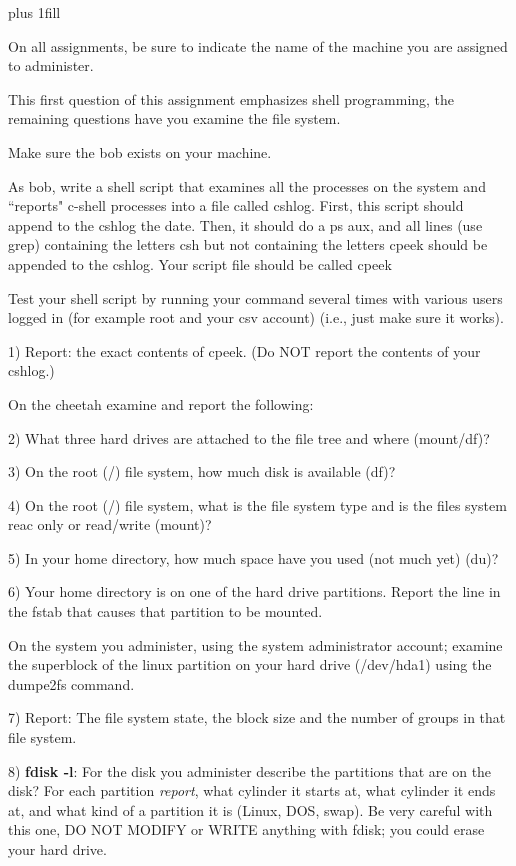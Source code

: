 
\rightskip=0pt plus 1fill

\parindent 0pt

On all assignments, be sure to indicate the name of the
machine you are assigned to administer.

This first question of this assignment emphasizes shell programming,
the remaining questions have you examine the file system.

Make sure the {\ltt{}bob} exists on your 
machine.

As bob, write a shell script that examines all the processes on the
system and ``reports" c-shell processes
into a file called {\ltt{}cshlog}.
First, this script should append to the {\ltt{}cshlog} the {\ltt{}date}.
Then, it should do a {\ltt{}ps aux}, and all lines (use {\ltt{}grep})
containing the letters csh but not containing the letters cpeek
should be appended to the {\ltt{}cshlog}.
Your script file should be called {\ltt{}cpeek}

Test your shell script by
running your command several times with various users logged 
in (for example root and your csv account)
(i.e., just make sure it works).

1) Report: the exact contents of {\ltt{}cpeek}.
(Do NOT report the contents of your cshlog.)

On the {\ltt{}cheetah} examine and report the following:

2) What three hard drives are attached to the file tree and where (mount/df)?

3) On the root ({\ltt{}/}) file system, how much disk is available (df)?

4) On the root ({\ltt{}/}) file system, what is the file system type
and is the files system reac only or read/write (mount)?

5) In your home directory, how much space have you used (not much yet) (du)?

6) Your home directory is on one of the hard drive partitions.
Report the line in the {\ltt{}fstab} that causes that partition
to be mounted.

On the system you administer, using the system administrator account;
examine the superblock of the linux partition on your hard drive
({\ltt{}/dev/hda1}) using the {\ltt{}dumpe2fs} command.

7) Report: The file system state, the block size and the number of groups
in that file system.

8) {\bf fdisk -l}:
For the disk you administer describe the partitions that are on the disk?
For each partition {\it report}, what cylinder it starts at,
what cylinder it ends at,
and what kind of a partition it is (Linux, DOS, swap).
Be very careful with this one, 
DO NOT MODIFY or WRITE anything with fdisk; 
you could erase your hard drive.

\bye

